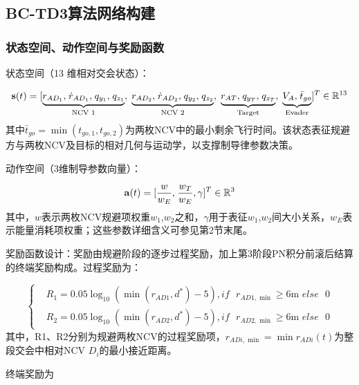 \subsection{BC-TD3算法网络构建}
\subsubsection{状态空间、动作空间与奖励函数}
状态空间（13 维相对交会状态）：

\begin{equation}
\label{eq:72}
{\mathbf{s}}(t) = {[\underbrace {{r_{A{D_1}}},{\kern 1pt} {{\dot r}_{A{D_1}}},{\kern 1pt} {q_{{y_1}}},{\kern 1pt} {q_{{z_1}}}}_{{\text{NCV 1}}},\;\underbrace {{r_{A{D_2}}},{\kern 1pt} {{\dot r}_{A{D_2}}},{\kern 1pt} {q_{{y_2}}},{\kern 1pt} {q_{{z_2}}}}_{{\text{NCV 2}}},\;\underbrace {{r_{AT}},{\kern 1pt} {q_{{y_T}}},{\kern 1pt} {q_{{z_T}}}}_{{\text{Target}}},\;\underbrace {{V_A},{\kern 1pt} \bar{t}_{go}}_{{\text{Evader}}}]^T} \in {\mathbb{R}^{13}}
\end{equation}
其中$\bar{t}_{go} = \min ({t_{go,1}},{t_{go,2}})$为两枚NCV中的最小剩余飞行时间。该状态表征规避方与两枚NCV及目标的相对几何与运动学，以支撑制导律参数决策。

动作空间（3维制导参数向量）：

\begin{equation}
\label{eq:73}
{\mathbf{a}}(t) = {[\frac{w}{{{w_E}}},{\kern 1pt} \frac{{{w_T}}}{{{w_E}}},\gamma ]^T} \in {\mathbb{R}^3}
\end{equation}
其中，$w$表示两枚NCV规避项权重${w_1}$,${w_2}$之和，$\gamma $用于表征${w_1}$,${w_2}$间大小关系，${w_E}$表示能量消耗项权重；这些参数详细含义可参见第2节末尾。

奖励函数设计：奖励由规避阶段的逐步过程奖励，加上第3阶段PN积分前滚后结算的终端奖励构成。过程奖励为：

\begin{equation}
\label{eq:74}
\left\{
\begin{aligned}
& {R_1} = 0.05{\log _{10}}(\min ({r_{AD1}},{d^*}) - 5),if{\text{ }}{r_{AD1,\min }} \geqslant 6{\text{m }}else{\text{ }}0 \\
& {R_2} = 0.05{\log _{10}}(\min ({r_{AD2}},{d^*}) - 5),if{\text{ }}{r_{AD2,\min }} \geqslant 6{\text{m }}else{\text{ }}0
\end{aligned}
\right.
\end{equation}
其中，R1、R2分别为规避两枚NCV的过程奖励项，${r_{ADi,\min }} = \min {r_{ADi}}(t)$为整段交会中相对NCV ${D_i}$的最小接近距离。

终端奖励为

